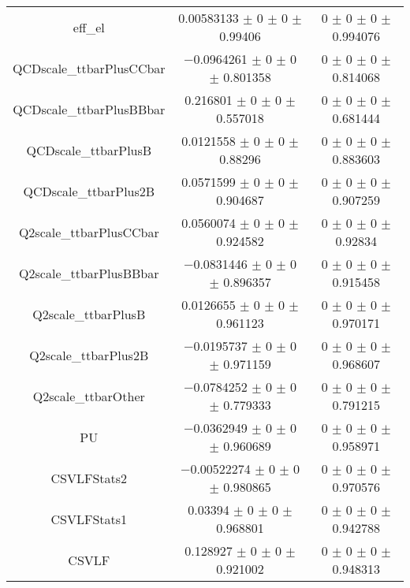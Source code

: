 \begin{table}
\begin{tabular}{ccc}
eff\_el 	& \num{0.00583133} $\pm$ \num{0} $\pm$ \num{0} $\pm$ \num{0.99406} 	& \num{0} $\pm$ \num{0} $\pm$ \num{0} $\pm$ \num{0.994076}\\
QCDscale\_ttbarPlusCCbar 	& \num{-0.0964261} $\pm$ \num{0} $\pm$ \num{0} $\pm$ \num{0.801358} 	& \num{0} $\pm$ \num{0} $\pm$ \num{0} $\pm$ \num{0.814068}\\
QCDscale\_ttbarPlusBBbar 	& \num{0.216801} $\pm$ \num{0} $\pm$ \num{0} $\pm$ \num{0.557018} 	& \num{0} $\pm$ \num{0} $\pm$ \num{0} $\pm$ \num{0.681444}\\
QCDscale\_ttbarPlusB 	& \num{0.0121558} $\pm$ \num{0} $\pm$ \num{0} $\pm$ \num{0.88296} 	& \num{0} $\pm$ \num{0} $\pm$ \num{0} $\pm$ \num{0.883603}\\
QCDscale\_ttbarPlus2B 	& \num{0.0571599} $\pm$ \num{0} $\pm$ \num{0} $\pm$ \num{0.904687} 	& \num{0} $\pm$ \num{0} $\pm$ \num{0} $\pm$ \num{0.907259}\\
Q2scale\_ttbarPlusCCbar 	& \num{0.0560074} $\pm$ \num{0} $\pm$ \num{0} $\pm$ \num{0.924582} 	& \num{0} $\pm$ \num{0} $\pm$ \num{0} $\pm$ \num{0.92834}\\
Q2scale\_ttbarPlusBBbar 	& \num{-0.0831446} $\pm$ \num{0} $\pm$ \num{0} $\pm$ \num{0.896357} 	& \num{0} $\pm$ \num{0} $\pm$ \num{0} $\pm$ \num{0.915458}\\
Q2scale\_ttbarPlusB 	& \num{0.0126655} $\pm$ \num{0} $\pm$ \num{0} $\pm$ \num{0.961123} 	& \num{0} $\pm$ \num{0} $\pm$ \num{0} $\pm$ \num{0.970171}\\
Q2scale\_ttbarPlus2B 	& \num{-0.0195737} $\pm$ \num{0} $\pm$ \num{0} $\pm$ \num{0.971159} 	& \num{0} $\pm$ \num{0} $\pm$ \num{0} $\pm$ \num{0.968607}\\
Q2scale\_ttbarOther 	& \num{-0.0784252} $\pm$ \num{0} $\pm$ \num{0} $\pm$ \num{0.779333} 	& \num{0} $\pm$ \num{0} $\pm$ \num{0} $\pm$ \num{0.791215}\\
PU 	& \num{-0.0362949} $\pm$ \num{0} $\pm$ \num{0} $\pm$ \num{0.960689} 	& \num{0} $\pm$ \num{0} $\pm$ \num{0} $\pm$ \num{0.958971}\\
CSVLFStats2 	& \num{-0.00522274} $\pm$ \num{0} $\pm$ \num{0} $\pm$ \num{0.980865} 	& \num{0} $\pm$ \num{0} $\pm$ \num{0} $\pm$ \num{0.970576}\\
CSVLFStats1 	& \num{0.03394} $\pm$ \num{0} $\pm$ \num{0} $\pm$ \num{0.968801} 	& \num{0} $\pm$ \num{0} $\pm$ \num{0} $\pm$ \num{0.942788}\\
CSVLF 	& \num{0.128927} $\pm$ \num{0} $\pm$ \num{0} $\pm$ \num{0.921002} 	& \num{0} $\pm$ \num{0} $\pm$ \num{0} $\pm$ \num{0.948313}\\

\end{tabular}
\end{table}
